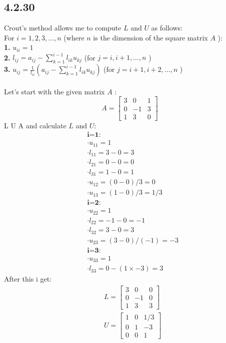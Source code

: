 \documentclass[manuscript,screen,review]{acmart}
\begin{document}
\subsection*{4.2.30}
Crout's method allows me to compute $L$ and $U$ as follows:
\\
For $i=1,2,3, \ldots, n$ (where $n$ is the dimension of the square matrix $A$ ):
\\
\textbf{1. }$u_{i i}=1$
\\
\textbf{2.} $l_{i j}=a_{i j}-\sum_{k=1}^{i-1} l_{i k} u_{k j}$ (for $j=i, i+1, \ldots, n$ )
\\
\textbf{3.} $u_{i j}=\frac{1}{l_{i i}}\left(a_{i j}-\sum_{k=1}^{i-1} l_{i k} u_{k j}\right)$ (for $j=i+1, i+2, \ldots, n$ )
\\
\\
Let's start with the given matrix $A$ :
$$
A=\left[\begin{array}{rrr}
3 & 0 & 1 \\
0 & -1 & 3 \\
1 & 3 & 0
\end{array}\right]
$$
 L  U  A  and calculate $L$ and $U$:
\\
$$
\begin{aligned}
& \textbf{i=1:} \\
& \cdot u_{11}=1 \\
& \cdot l_{11}=3-0=3 \\
& \cdot l_{21}=0-0=0 \\
& \cdot l_{31}=1-0=1 \\
& \cdot u_{12}=(0-0) / 3=0 \\
& \cdot u_{13}=(1-0) / 3=1 / 3 \\
& \textbf{i=2}: \\
& \cdot u_{22}=1 \\
& \cdot l_{22}=-1-0=-1 \\
& \cdot l_{32}=3-0=3 \\
& \cdot u_{23}=(3-0) /(-1)=-3 \\
& \textbf{i=3}: \\
& \cdot u_{33}=1 \\
& \cdot l_{33}=0-(1 \times-3)=3
\end{aligned}
$$
After this i get:
$$
\begin{aligned}
& L=\left[\begin{array}{rrr}
3 & 0 & 0 \\
0 & -1 & 0 \\
1 & 3 & 3
\end{array}\right] \\
& U=\left[\begin{array}{rrr}
1 & 0 & 1 / 3 \\
0 & 1 & -3 \\
0 & 0 & 1
\end{array}\right]
\end{aligned}
$$
\end{document}
